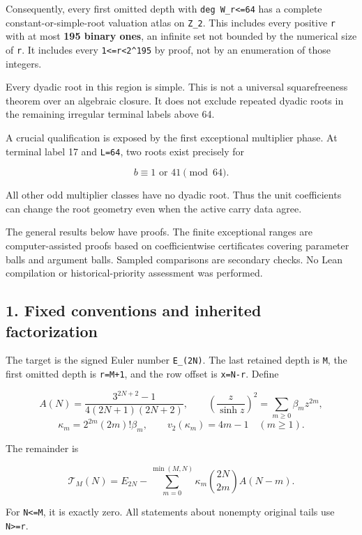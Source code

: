 \documentclass[11pt,letterpaper]{article}
\begin{document}
Consequently, every first omitted depth with \texttt{deg\ W\_r\textless{}=64} has a complete constant-or-simple-root valuation atlas on \texttt{Z\_2}. This includes every positive \texttt{r} with at most \textbf{195 binary ones}, an infinite set not bounded by the numerical size of \texttt{r}. It includes every \texttt{1\textless{}=r\textless{}2\^{}195} by proof, not by an enumeration of those integers.

Every dyadic root in this region is simple. This is not a universal squarefreeness theorem over an algebraic closure. It does not exclude repeated dyadic roots in the remaining irregular terminal labels above 64.

A crucial qualification is exposed by the first exceptional multiplier phase. At terminal label 17 and \texttt{L=64}, two roots exist precisely for

\[
\boxed{b\equiv1\text{ or }41\pmod{64}.} \tag{VI.2}
\]

All other odd multiplier classes have no dyadic root. Thus the unit coefficients can change the root geometry even when the active carry data agree.

The general results below have proofs. The finite exceptional ranges are computer-assisted proofs based on coefficientwise certificates covering parameter balls and argument balls. Sampled comparisons are secondary checks. No Lean compilation or historical-priority assessment was performed.

\subsection{1. Fixed conventions and inherited factorization}\label{fixed-conventions-and-inherited-factorization}

The target is the signed Euler number \texttt{E\_(2N)}. The last retained depth is \texttt{M}, the first omitted depth is \texttt{r=M+1}, and the row offset is \texttt{x=N-r}. Define

\[
A(N)=\frac{3^{2N+2}-1}{4(2N+1)(2N+2)},\qquad
\left(\frac z{\sinh z}\right)^2=\sum_{m\ge0}\beta_mz^{2m},
\] \[
\kappa_m=2^{2m}(2m)!\beta_m,\qquad
v_2(\kappa_m)=4m-1\quad(m\ge1).
\]

The remainder is

\[
\mathcal T_M(N)=E_{2N}-\sum_{m=0}^{\min(M,N)}
\kappa_m\binom{2N}{2m}A(N-m).
\]

For \texttt{N\textless{}=M}, it is exactly zero. All statements about nonempty original tails use \texttt{N\textgreater{}=r}.
\end{document}
